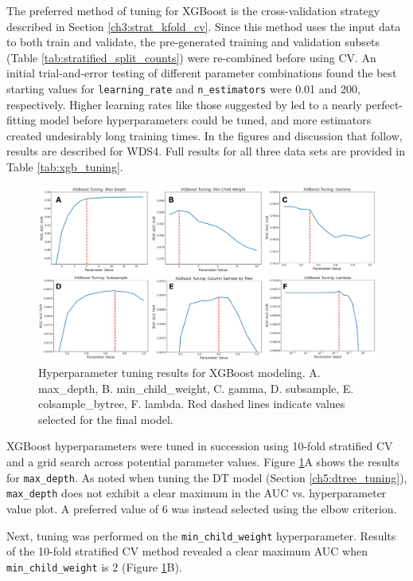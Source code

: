 The preferred method of tuning for XGBoost is the cross-validation strategy described in Section \ref{ch3:strat_kfold_cv}. Since this method uses the input data to both train and validate, the pre-generated training and validation subsets (Table \ref{tab:stratified_split_counts}) were re-combined before using CV. An initial trial-and-error testing of different parameter combinations found the best starting values for \verb|learning_rate| and \verb|n_estimators| were 0.01 and 200, respectively. Higher learning rates like those suggested by \citet{jain_xgboost_2016} led to a nearly perfect-fitting model before hyperparameters could be tuned, and more estimators created undesirably long training times. In the figures and discussion that follow, results are described for WDS4. Full results for all three data sets are provided in Table \ref{tab:xgb_tuning}.

\begin{figure}[!htp]
\centering
\includegraphics[width=\textwidth]{templates/images/Figure-XGB_Hyperparameters.png}
\caption[XGBoost hyperparameter tuning]{Hyperparameter tuning results for XGBoost modeling. A. max\_depth, B. min\_child\_weight, C. gamma, D. subsample, E. colsample\_bytree, F. lambda. Red dashed lines indicate values selected for the final model.}
\label{fig:xgb_hyperparam}
\end{figure}

XGBoost hyperparameters were tuned in succession using 10-fold stratified CV and a grid search across potential parameter values. Figure \ref{fig:xgb_hyperparam}A shows the results for \verb|max_depth|. As noted when tuning the DT model (Section \ref{ch5:dtree_tuning}), \verb|max_depth| does not exhibit a clear maximum in the AUC vs. hyperparameter value plot. A preferred value of 6 was instead selected using the elbow criterion.

Next, tuning was performed on the \verb|min_child_weight| hyperparameter. Results of the 10-fold stratified CV method revealed a clear maximum AUC when \verb|min_child_weight| is 2 (Figure \ref{fig:xgb_hyperparam}B).

